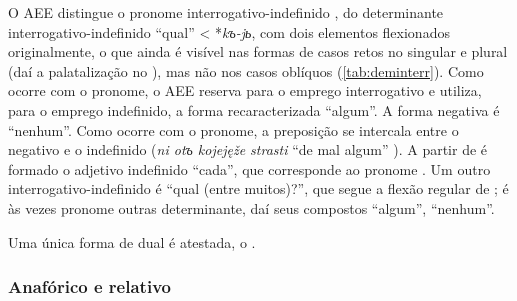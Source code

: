 O AEE distingue o pronome interrogativo-indefinido ,
 do determinante interrogativo-indefinido 
``qual'' < *\emph{kъ-jь}, com dois elementos flexionados originalmente, o
que ainda é visível nas formas de casos retos no singular e plural (daí
a palatalização no  ), mas não nos casos
oblíquos (\autoref{tab:deminterr}). Como ocorre com o pronome, o AEE reserva
 para o emprego interrogativo e utiliza, para o emprego
indefinido, a forma recaracterizada  ``algum''. A forma
negativa é  ``nenhum''. Como ocorre com o pronome, a
preposição se intercala entre o negativo e o indefinido (\emph{ni otъ
kojejęže strasti} ``de mal algum'' ). A partir de
 é formado o adjetivo indefinido 
``cada'', que corresponde ao pronome . Um outro
interrogativo-indefinido é  ``qual (entre muitos)?'',
que segue a flexão regular de ;  é
às vezes pronome outras determinante, daí seus compostos
 ``algum'', 
``nenhum''.



Uma única forma de dual é atestada, o  .

\subsubsection{Anafórico e relativo}\label{sec:anafóricoerelativo}

